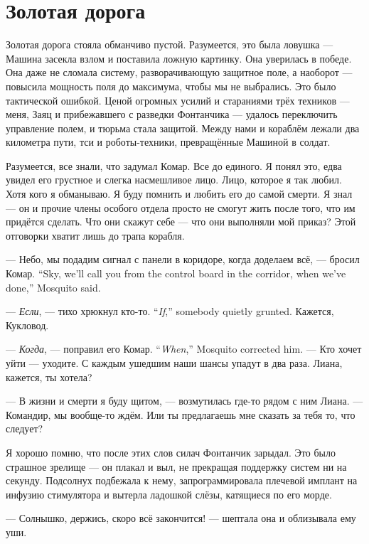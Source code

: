 \section{Золотая дорога}

Золотая дорога стояла обманчиво пустой.
Разумеется, это была ловушка --- Машина засекла взлом и поставила ложную картинку.
Она уверилась в победе.
Она даже не сломала систему, разворачивающую защитное поле, а наоборот --- повысила мощность поля до максимума, чтобы мы не выбрались.
Это было тактической ошибкой.
Ценой огромных усилий и стараниями трёх техников --- меня, Заяц и прибежавшего с разведки Фонтанчика --- удалось переключить управление полем, и тюрьма стала защитой.
Между нами и кораблём лежали два километра пути, тси и роботы-техники, превращённые Машиной в солдат.

Разумеется, все знали, что задумал Комар.
Все до единого.
Я понял это, едва увидел его грустное и слегка насмешливое лицо.
Лицо, которое я так любил.
Хотя кого я обманываю.
Я буду помнить и любить его до самой смерти.
Я знал --- он и прочие члены особого отдела просто не смогут жить после того, что им придётся сделать.
Что они скажут себе --- что они выполняли мой приказ?
Этой отговорки хватит лишь до трапа корабля.

{--- Небо, мы подадим сигнал с панели в коридоре, когда доделаем всё, --- бросил Комар.}
{``Sky, we'll call you from the control board in the corridor, when we've done,'' Mosquito said.}

{--- \emph{Если}, --- тихо хрюкнул кто-то.}
{``\emph{If},'' somebody quietly grunted.}
Кажется, Кукловод.

{--- \emph{Когда}, --- поправил его Комар.}
{``\emph{When},'' Mosquito corrected him.}
--- Кто хочет уйти --- уходите.
С каждым ушедшим наши шансы упадут в два раза.
Лиана, кажется, ты хотела?

--- В жизни и смерти я буду щитом, --- возмутилась где-то рядом с ним Лиана.
--- Командир, мы вообще-то ждём.
Или ты предлагаешь мне сказать за тебя то, что следует?

Я хорошо помню, что после этих слов силач Фонтанчик зарыдал.
Это было страшное зрелище --- он плакал и выл, не прекращая поддержку систем ни на секунду.
Подсолнух подбежала к нему, запрограммировала плечевой имплант на инфузию стимулятора и вытерла ладошкой слёзы, катящиеся по его морде.

--- Солнышко, держись, скоро всё закончится! --- шептала она и облизывала ему уши.

